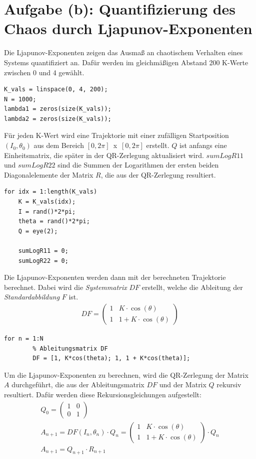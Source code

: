 \documentclass[paper=a4, 
                DIV=12]{scrartcl}
\begin{document}
\section{Aufgabe (b): Quantifizierung des Chaos durch Ljapunov-Exponenten}
Die Ljapunov-Exponenten zeigen das Ausmaß an chaotischem Verhalten eines Systems quantifiziert an.
Dafür werden im gleichmäßigen Abstand 200 K-Werte zwischen 0 und 4 gewählt. 
\begin{lstlisting}[frame=single, style=Matlab-editor]
K_vals = linspace(0, 4, 200);
N = 1000;
lambda1 = zeros(size(K_vals));
lambda2 = zeros(size(K_vals));
\end{lstlisting}
Für jeden K-Wert wird eine Trajektorie mit einer zufälligen Startposition $(I_0, \theta_0)$ aus dem Bereich \hbox{$[0,2\pi]$ x $[0,2\pi]$} erstellt.
$Q$ ist anfangs eine Einheitsmatrix, die später in der QR-Zerlegung aktualisiert wird. $sumLogR11$ und $sumLogR22$ sind die Summen der Logarithmen der ersten beiden Diagonalelemente der Matrix $R$, die aus der QR-Zerlegung resultiert.
\begin{lstlisting}[frame=single, style=Matlab-editor]
for idx = 1:length(K_vals)
    K = K_vals(idx);
    I = rand()*2*pi;
    theta = rand()*2*pi;
    Q = eye(2);
    
    sumLogR11 = 0;
    sumLogR22 = 0;
\end{lstlisting}
Die Ljapunov-Exponenten werden dann mit der berechneten Trajektorie berechnet. 
Dabei wird die \textit{Systemmatrix} $DF$ erstellt, welche die Ableitung der \textit{Standardabbildung} $F$ ist.
\begin{gather*}
    DF = \begin{pmatrix}
        1 & K \cdot \cos(\theta) \\
        1 & 1 + K \cdot \cos(\theta)
    \end{pmatrix}
\end{gather*}
\begin{lstlisting}[frame=single, style=Matlab-editor]
    for n = 1:N
        % Ableitungsmatrix DF
        DF = [1, K*cos(theta); 1, 1 + K*cos(theta)];
\end{lstlisting}
Um die Ljapunov-Exponenten zu berechnen, wird die QR-Zerlegung der Matrix $A$ durchgeführt, die aus der Ableitungsmatrix $DF$ und der Matrix $Q$  rekursiv resultiert.
Dafür werden diese Rekursionsgleichungen aufgestellt:
\begin{gather*}
    Q_0 =
    \begin{pmatrix}
        1 & 0 \\
        0 & 1
    \end{pmatrix} \\
    A_{n+1} = DF(I_n, \theta_n) \cdot Q_n = 
    \begin{pmatrix}
        1 & K \cdot \cos(\theta) \\
        1 & 1 + K \cdot \cos(\theta)
    \end{pmatrix} \cdot Q_n \\
    A_{n+1} = Q_{n+1} \cdot R_{n+1}
\end{gather*}
\end{document}

